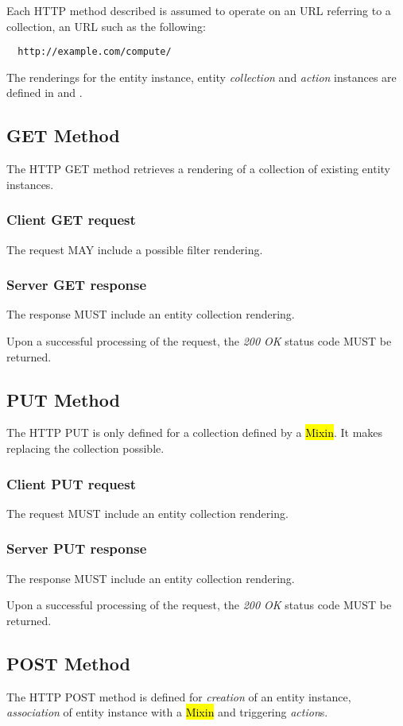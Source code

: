\documentclass[10pt,a4paper]{article}
\begin{document}
Each HTTP method described is assumed to operate
on an URL referring to a collection, an URL such as the following:
\begin{verbatim}
  http://example.com/compute/
\end{verbatim}

The renderings for the entity instance, entity {\em collection} and {\em action}
instances are defined in \cite{occi:text} and \cite{occi:json}.

\subsection{GET Method}
The HTTP GET method retrieves a rendering of a collection of existing entity instances.

\subsubsection*{Client GET request}
The request MAY include a possible filter rendering.

\subsubsection*{Server GET response}
The response MUST include an entity collection rendering.

Upon a successful processing of the request, the \emph{200 OK} status code MUST be returned.

\subsection{PUT Method}
The HTTP PUT is only defined for a collection defined by a \hl{Mixin}. It makes replacing the collection possible.

\subsubsection*{Client PUT request}
The request MUST include an entity collection rendering.

\subsubsection*{Server PUT response}
The response MUST include an entity collection rendering.

Upon a successful processing of the request, the \emph{200 OK} status code MUST be returned.

\subsection{POST Method}
The HTTP POST method is defined for {\em creation} of an entity instance, {\em association}
of entity instance with a \hl{Mixin} and triggering {\em action}s.
\end{document}
